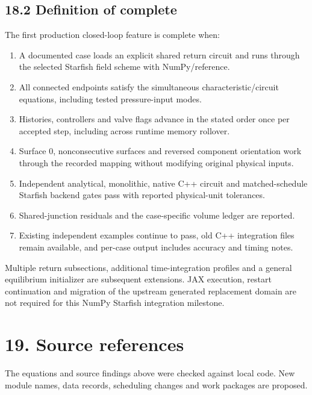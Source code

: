 \documentclass[11pt,a4paper]{article}
\begin{document}
\subsection{18.2 Definition of complete}
The first production closed-loop feature is complete when:


\begin{enumerate}
\item A documented case loads an explicit shared return circuit and runs through the selected Starfish field scheme with NumPy/reference.


\item All connected endpoints satisfy the simultaneous characteristic/circuit equations, including tested pressure-input modes.


\item Histories, controllers and valve flags advance in the stated order once per accepted step, including across runtime memory rollover.


\item Surface 0, nonconsecutive surfaces and reversed component orientation work through the recorded mapping without modifying original physical inputs.


\item Independent analytical, monolithic, native C++ circuit and matched-schedule Starfish backend gates pass with reported physical-unit tolerances.


\item Shared-junction residuals and the case-specific volume ledger are reported.


\item Existing independent examples continue to pass, old C++ integration files remain available, and per-case output includes accuracy and timing notes.


\end{enumerate}
Multiple return subsections, additional time-integration profiles and a general equilibrium initializer are subsequent extensions. JAX execution, restart continuation and migration of the upstream generated replacement domain are not required for this NumPy Starfish integration milestone.

\section{19. Source references}
The equations and source findings above were checked against local code. New module names, data records, scheduling changes and work packages are proposed.
\end{document}
